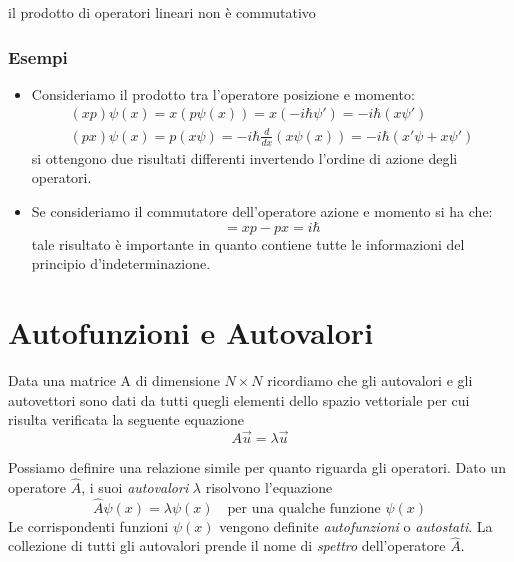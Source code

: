 \begin{remark}
	il prodotto di operatori lineari non \`e commutativo
\end{remark}
 
 \subsubsection{Esempi}
 
 \begin{itemize}
 	\item Consideriamo il prodotto tra l'operatore posizione e momento:
 	\begin{equation*}
 	\begin{array}{l}
 		(xp)\psi(x) = x(p\psi(x)) = x(-i\hbar \psi') = -i\hbar(x\psi') \\[0.2cm]
 		(px)\psi(x) = p (x \psi) = -i\hbar \frac{d}{dx}(x\psi(x)) = -i \hbar(x'\psi + x\psi')
 	\end{array}
 	\end{equation*}
 	si ottengono due risultati differenti invertendo l'ordine di azione degli operatori.
 	\item Se consideriamo il commutatore dell'operatore azione e momento si ha che: 
 	\begin{equation*}
 		[x,p] = xp - px = i\hbar 
 	\end{equation*}
 	tale risultato \`e importante in quanto contiene tutte le informazioni del principio d'indeterminazione.
 \end{itemize}

\section{Autofunzioni e Autovalori}

Data una matrice A di dimensione $N \times N$ ricordiamo che gli autovalori e gli autovettori sono dati da tutti quegli elementi dello spazio vettoriale per cui risulta verificata la seguente equazione
\begin{equation*}
	A \vec{u} = \lambda \vec{u}
\end{equation*}

\noindent Possiamo definire una relazione simile per quanto riguarda gli operatori. Dato un operatore $\hat{A}$, i suoi \textit{autovalori} $\lambda$ risolvono l'equazione
\begin{equation}
	\hat{A} \psi(x) = \lambda \psi(x) \quad \text{per una qualche funzione } \psi(x)
\end{equation}
Le corrispondenti funzioni $\psi(x)$ vengono definite \textit{autofunzioni} o \textit{autostati}. La collezione di tutti gli autovalori prende il nome di \textit{spettro} dell'operatore $\hat{A}$.
\\

